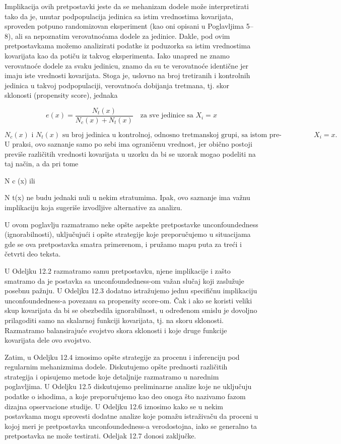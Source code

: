 \documentclass[12pt, a4paper]{article}
\begin{document}
Implikacija ovih pretpostavki jeste da se mehanizam dodele može interpretirati tako da je, unutar podpopulacija jedinica sa istim vrednostima kovarijata, sproveden potpuno randomizovan eksperiment (kao oni opisani u Poglavljima 5–8), ali sa nepoznatim verovatnoćama dodele za jedinice. Dakle, pod ovim pretpostavkama možemo analizirati podatke iz poduzorka sa istim vrednostima kovarijata kao da potiču iz takvog eksperimenta.
Iako unapred ne znamo verovatnoće dodele za svaku jedinicu, znamo da su te verovatnoće identične jer imaju iste vrednosti kovarijata. Stoga je, uslovno na broj tretiranih i kontrolnih jedinica u takvoj podpopulaciji, verovatnoća dobijanja tretmana, tj. skor sklonosti (propensity score), jednaka

\[
e(x) = \frac{N_t(x)}{N_c(x) + N_t(x)} \quad \text{za sve jedinice sa } X_i = x
\]

\[
N_c(x) \text{ i } N_t(x) \text{ su broj jedinica u kontrolnoj, odnosno tretmanskoj grupi, 
sa istom pre-tretmanskom vrednošću } X_i = x.
\]
U praksi, ovo saznanje samo po sebi ima ograničenu vrednost, jer obično postoji previše različitih vrednosti kovarijata u uzorku da bi se uzorak mogao podeliti na taj način, a da pri tome  

N
c
(x) ili 

N
t(x) ne budu jednaki nuli u nekim stratumima. Ipak, ovo saznanje ima važnu implikaciju koja sugeriše izvodljive alternative za analizu.

U ovom poglavlju razmatramo neke opšte aspekte pretpostavke unconfoundedness (ignorabilnosti), uključujući i opšte strategije koje preporučujemo u situacijama gde se ova pretpostavka smatra primerenom, i pružamo mapu puta za treći i četvrti deo teksta.

U Odeljku 12.2 razmatramo samu pretpostavku, njene implikacije i zašto smatramo da je postavka sa unconfoundedness-om važan slučaj koji zaslužuje posebnu pažnju. U Odeljku 12.3 dodatno istražujemo jednu specifičnu implikaciju unconfoundedness-a povezanu sa propensity score-om. Čak i ako se koristi veliki skup kovarijata da bi se obezbedila ignorabilnost, u određenom smislu je dovoljno prilagoditi samo na skalarnoj funkciji kovarijata, tj. na skoru sklonosti. Razmatramo balansirajuće svojstvo skora sklonosti i koje druge funkcije kovarijata dele ovo svojstvo.

Zatim, u Odeljku 12.4 iznosimo opšte strategije za procenu i inferenciju pod regularnim mehanizmima dodele. Diskutujemo opšte prednosti različitih strategija i opisujemo metode koje detaljnije razmatramo u narednim poglavljima. U Odeljku 12.5 diskutujemo preliminarne analize koje ne uključuju podatke o ishodima, a koje preporučujemo kao deo onoga što nazivamo fazom dizajna opservacione studije. U Odeljku 12.6 iznosimo kako se u nekim postavkama mogu sprovesti dodatne analize koje pomažu istraživaču da proceni u kojoj meri je pretpostavka unconfoundedness-a verodostojna, iako se generalno ta pretpostavka ne može testirati. Odeljak 12.7 donosi zaključke.
\end{document}
